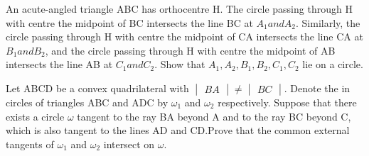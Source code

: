 \item An acute-angled triangle ABC has orthocentre H. The circle passing through H with centre the midpoint of BC intersects the line BC at $A_1 and A_2$. Similarly, the circle passing through H with centre the midpoint of CA intersects the line CA at $B_1 and B_2$, and the circle passing through H with centre the midpoint of AB intersects the line AB at $C_1 and C_2$. Show that $A_1, A_2, B_1, B_2,
C_1, C_2$ lie on a circle.

\item Let ABCD be a convex quadrilateral with $\begin{vmatrix} BA \end{vmatrix} \neq \begin{vmatrix} BC \end{vmatrix}$. Denote the in circles of triangles ABC and ADC by $\omega_1$ and $\omega_2$ respectively. Suppose that there exists a circle $\omega$ tangent to the ray BA beyond A and to the ray BC beyond C, which is also tangent to the lines AD and CD.Prove that the common external tangents of $\omega_1$ and $\omega_2$ intersect on $\omega$.

